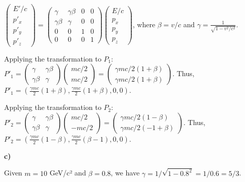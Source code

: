 \documentclass{article}
\begin{document}
$\begin{pmatrix} E'/c \\ p'_x \\ p'_y \\ p'_z \end{pmatrix} = \begin{pmatrix} \gamma & \gamma\beta & 0 & 0 \\ \gamma\beta & \gamma & 0 & 0 \\ 0 & 0 & 1 & 0 \\ 0 & 0 & 0 & 1 \end{pmatrix} \begin{pmatrix} E/c \\ p_x \\ p_y \\ p_z \end{pmatrix}$, where $\beta = v/c$ and $\gamma = \frac{1}{\sqrt{1-v^2/c^2}}$.

Applying the transformation to $P_1$:
$P'_1 = \begin{pmatrix} \gamma & \gamma\beta \\ \gamma\beta & \gamma \end{pmatrix} \begin{pmatrix} mc/2 \\ mc/2 \end{pmatrix} = \begin{pmatrix} \gamma mc/2(1+\beta) \\ \gamma mc/2(1+\beta) \end{pmatrix}$.
Thus, $P'_1 = \left( \frac{\gamma mc}{2}(1+\beta), \frac{\gamma mc}{2}(1+\beta), 0, 0 \right)$.

Applying the transformation to $P_2$:
$P'_2 = \begin{pmatrix} \gamma & \gamma\beta \\ \gamma\beta & \gamma \end{pmatrix} \begin{pmatrix} mc/2 \\ -mc/2 \end{pmatrix} = \begin{pmatrix} \gamma mc/2(1-\beta) \\ \gamma mc/2(-1+\beta) \end{pmatrix}$.
Thus, $P'_2 = \left( \frac{\gamma mc}{2}(1-\beta), \frac{\gamma mc}{2}(\beta-1), 0, 0 \right)$.

\textbf{c)}

Given $m = 10$ GeV/c² and $\beta = 0.8$, we have $\gamma = 1/\sqrt{1 - 0.8^2} = 1/0.6 = 5/3$.
\end{document}
